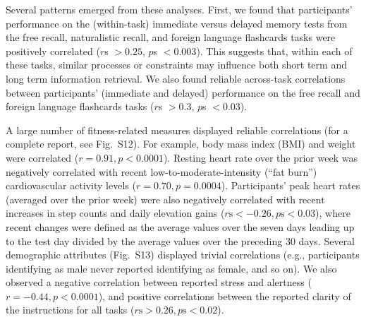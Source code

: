 \documentclass[10pt]{article}
\newcommand{\fitFitCorr}{S12}
\newcommand{\demDemCorr}{S13}
\begin{document}
Several patterns emerged from these analyses.  First, we found that
participants' performance on the (within-task) immediate versus delayed memory tests
from the free recall, naturalistic recall, and foreign language
flashcards tasks were positively correlated ($r$s $> 0.25$, $p$s $< 0.003$).  This suggests that, within each of these tasks,
similar processes or constraints may influence both short term and
long term information retrieval.  We also found reliable across-task correlations
between participants' (immediate and delayed) performance on the free
recall and foreign language flashcards tasks ($r$s $> 0.3$, $p$s $< 0.03$).

A large number of fitness-related measures displayed reliable
correlations (for a complete report, see Fig.~\fitFitCorr).  For
example, body mass index (BMI) and weight were correlated
($r = 0.91, p < 0.0001$).  Resting heart rate over
the prior week was negatively correlated with recent
low-to-moderate-intensity (``fat burn'') cardiovascular
activity levels ($r = 0.70, p = 0.0004$).
Participants' peak heart rates (averaged over the prior week) were also
negatively correlated with recent increases in step counts and daily
elevation gains ($r\mathrm{s} < -0.26, p\mathrm{s} < 0.03$), where recent changes were defined as the average values
over the seven days leading up to the test day divided by the average
values over the preceding 30 days.  Several demographic
attributes (Fig.~\demDemCorr) displayed trivial correlations (e.g.,
participants identifying as male never reported identifying as female,
and so on).  We also observed a negative correlation between reported
stress and alertness ($r = -0.44, p < 0.0001$), and
positive correlations between the reported clarity of the instructions for all
tasks ($r\mathrm{s} > 0.26, p\mathrm{s} < 0.02$).
\end{document}
